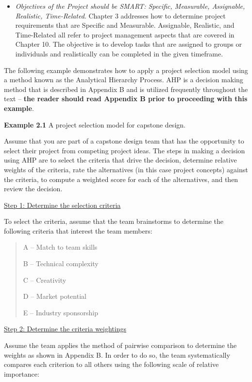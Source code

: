 \begin{itemize}
\item
  \emph{Objectives of the Project should be SMART: Specific, Measurable,
  Assignable, Realistic, Time-Related}. Chapter 3 addresses how to
  determine project requirements that are Specific and Measurable.
  Assignable, Realistic, and Time-Related all refer to project
  management aspects that are covered in Chapter 10. The objective is to
  develop tasks that are assigned to groups or individuals and
  realistically can be completed in the given timeframe.
\end{itemize}

The following example demonstrates how to apply a project selection
model using a method known as the Analytical Hierarchy Process. AHP is a
decision making method that is described in Appendix B and is utilized
frequently throughout the text -- \textbf{the reader should read
Appendix B prior to proceeding with this example}.

\cbstart

\textbf{Example 2.1} A project selection model for capstone design.

Assume that you are part of a capstone design team that has the
opportunity to select their project from competing project ideas. The
steps in making a decision using AHP are to select the criteria that
drive the decision, determine relative weights of the criteria, rate the
alternatives (in this case project concepts) against the criteria, to
compute a weighted score for each of the alternatives, and then review
the decision.

\ul{Step 1: Determine the selection criteria}

To select the criteria, assume that the team brainstorms to determine
the following criteria that interest the team members:

\begin{quote}
A -- Match to team skills

B -- Technical complexity

C -- Creativity

D -- Market potential

E -- Industry sponsorship
\end{quote}

\ul{Step 2: Determine the criteria weightings}

Assume the team applies the method of pairwise comparison to determine
the weights as shown in Appendix B. In order to do so, the team
systematically compares each criterion to all others using the following
scale of relative importance:

